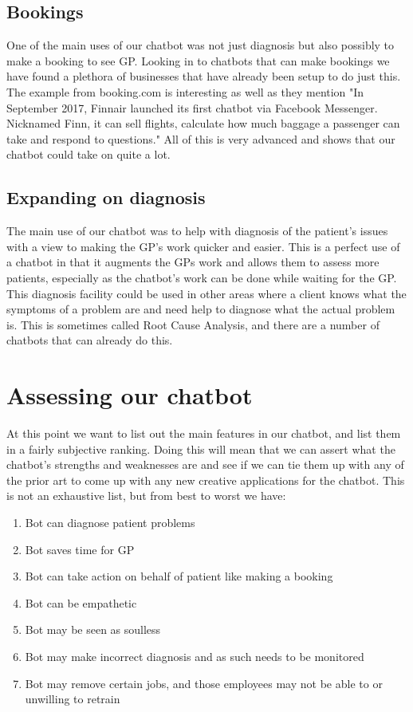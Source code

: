 \documentclass{article}
\begin{document}
\subsection{Bookings}\label{booking}
One of the main uses of our chatbot was not just diagnosis but also possibly to make a booking to see GP. Looking in to chatbots that can make bookings we have found a plethora of businesses that have already been setup to do just this.\cite{futr}\cite{booking}\cite{velma} The example from booking.com is interesting as well as they mention "In September 2017, Finnair launched its first chatbot via Facebook Messenger. Nicknamed Finn, it can sell flights, calculate how much baggage a passenger can take and respond to questions." All of this is very advanced and shows that our chatbot could take on quite a lot.

\subsection{Expanding on diagnosis}
The main use of our chatbot was to help with diagnosis of the patient's issues with a view to making the GP's work quicker and easier. This is a perfect use of a chatbot in that it augments the GPs work and allows them to assess more patients, especially as the chatbot's work can be done while waiting for the GP. 
This diagnosis facility could be used in other areas where a client knows what the symptoms of a problem are and need help to diagnose what the actual problem is. This is sometimes called Root Cause Analysis, and there are a number of chatbots that can already do this. \cite{gyan}\cite{devops}

\section{Assessing our chatbot}
At this point we want to list out the main features in our chatbot, and list them in a fairly subjective ranking. Doing this will mean that we can assert what the chatbot's strengths and weaknesses are and see if we can tie them up with any of the prior art to come up with any new creative applications for the chatbot.
\smallbreak
This is not an exhaustive list, but from best to worst we have:
\begin{enumerate}
    \item Bot can diagnose patient problems
    \item Bot saves time for GP
    \item Bot can take action on behalf of patient like making a booking
    \item Bot can be empathetic
    \item Bot may be seen as soulless
    \item Bot may make incorrect diagnosis and as such needs to be monitored
    \item Bot may remove certain jobs, and those employees may not be able to or unwilling to retrain
\end{enumerate}
\end{document}
